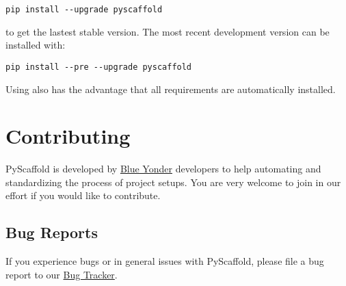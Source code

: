 \documentclass[letterpaper,10pt,english]{sphinxmanual}
\begin{document}
\begin{Verbatim}[commandchars=\\\{\}]
pip install --upgrade pyscaffold
\end{Verbatim}

to get the lastest stable version. The most recent development version can be
installed with:

\begin{Verbatim}[commandchars=\\\{\}]
pip install --pre --upgrade pyscaffold
\end{Verbatim}

Using  also has the advantage that all requirements are automatically
installed.


\section{Contributing}
\label{contrib:contributing}\label{contrib::doc}
PyScaffold is developed by \href{http://www.blue-yonder.com/en/}{Blue Yonder}
developers to help automating and standardizing the process of project setups.
You are very welcome to join in our effort if you would like to contribute.


\subsection{Bug Reports}
\label{contrib:bug-reports}
If you experience bugs or in general issues with PyScaffold, please file a bug
report to our \href{http://github.com/blue-yonder/pyscaffold/issues}{Bug Tracker}.
\end{document}

